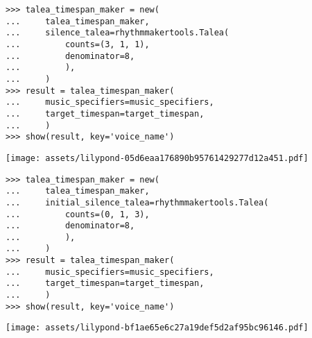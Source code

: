\begin{comment}
<abjad>
talea_timespan_maker = new(
    talea_timespan_maker,
    silence_talea=rhythmmakertools.Talea(
        counts=(3, 1, 1),
        denominator=8,
        ),
    )
result = talea_timespan_maker(
    music_specifiers=music_specifiers,
    target_timespan=target_timespan,
    )
show(result, key='voice_name')
</abjad>
\end{comment}

\begin{singlespacing}
\vspace{-0.5\baselineskip}
\begin{lstlisting}
>>> talea_timespan_maker = new(
...     talea_timespan_maker,
...     silence_talea=rhythmmakertools.Talea(
...         counts=(3, 1, 1),
...         denominator=8,
...         ),
...     )
>>> result = talea_timespan_maker(
...     music_specifiers=music_specifiers,
...     target_timespan=target_timespan,
...     )
>>> show(result, key='voice_name')
\end{lstlisting}
\noindent\texttt{[image: assets/lilypond-05d6eaa176890b95761429277d12a451.pdf]}
\end{singlespacing}

\begin{comment}
<abjad>
talea_timespan_maker = new(
    talea_timespan_maker,
    initial_silence_talea=rhythmmakertools.Talea(
        counts=(0, 1, 3),
        denominator=8,
        ),
    )
result = talea_timespan_maker(
    music_specifiers=music_specifiers,
    target_timespan=target_timespan,
    )
show(result, key='voice_name')
</abjad>
\end{comment}

\begin{singlespacing}
\vspace{-0.5\baselineskip}
\begin{lstlisting}
>>> talea_timespan_maker = new(
...     talea_timespan_maker,
...     initial_silence_talea=rhythmmakertools.Talea(
...         counts=(0, 1, 3),
...         denominator=8,
...         ),
...     )
>>> result = talea_timespan_maker(
...     music_specifiers=music_specifiers,
...     target_timespan=target_timespan,
...     )
>>> show(result, key='voice_name')
\end{lstlisting}
\noindent\texttt{[image: assets/lilypond-bf1ae65e6c27a19def5d2af95bc96146.pdf]}
\end{singlespacing}


